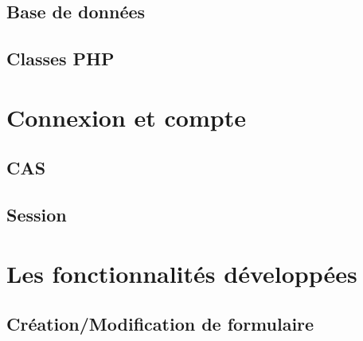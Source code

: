 \documentclass{sigplanconf}
\begin{document}
\noindent\begin{minipage}{\linewidth}%
\label{fonctionnementAppli}
\end{minipage}

\subsection{Base de données}
\subsection{Classes PHP}


\section{Connexion et compte}
\subsection{CAS}
\subsection{Session}
\section{Les fonctionnalités développées}
\subsection{Création/Modification de formulaire}
\end{document}
